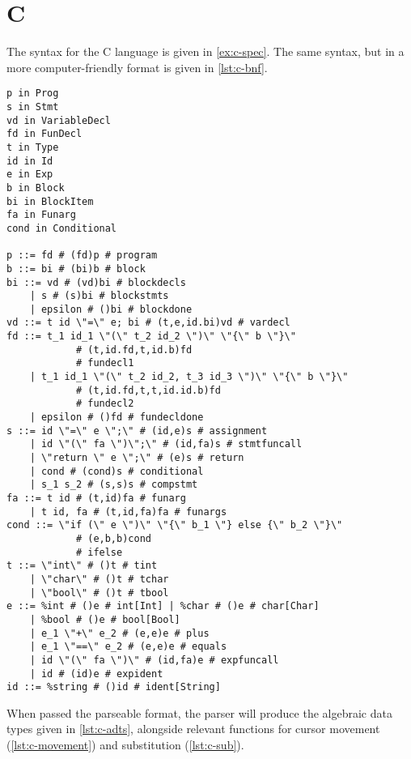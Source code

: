 \section{C}

The syntax for the C language is given in \cref{ex:c-spec}.
The same syntax, but in a more computer-friendly format is given in \cref{lst:c-bnf}.

\begin{lstlisting}[style=inline, caption={Parseable format of C language syntax}, label={lst:c-bnf}]
p in Prog
s in Stmt
vd in VariableDecl
fd in FunDecl
t in Type
id in Id
e in Exp
b in Block
bi in BlockItem
fa in Funarg
cond in Conditional

p ::= fd # (fd)p # program
b ::= bi # (bi)b # block
bi ::= vd # (vd)bi # blockdecls 
    | s # (s)bi # blockstmts 
    | epsilon # ()bi # blockdone
vd ::= t id \"=\" e; bi # (t,e,id.bi)vd # vardecl
fd ::= t_1 id_1 \"(\" t_2 id_2 \")\" \"{\" b \"}\" 
            # (t,id.fd,t,id.b)fd 
            # fundecl1 
    | t_1 id_1 \"(\" t_2 id_2, t_3 id_3 \")\" \"{\" b \"}\" 
            # (t,id.fd,t,t,id.id.b)fd 
            # fundecl2 
    | epsilon # ()fd # fundecldone
s ::= id \"=\" e \";\" # (id,e)s # assignment 
    | id \"(\" fa \")\";\" # (id,fa)s # stmtfuncall 
    | \"return \" e \";\" # (e)s # return 
    | cond # (cond)s # conditional 
    | s_1 s_2 # (s,s)s # compstmt
fa ::= t id # (t,id)fa # funarg 
    | t id, fa # (t,id,fa)fa # funargs
cond ::= \"if (\" e \")\" \"{\" b_1 \"} else {\" b_2 \"}\" 
            # (e,b,b)cond 
            # ifelse
t ::= \"int\" # ()t # tint 
    | \"char\" # ()t # tchar 
    | \"bool\" # ()t # tbool
e ::= %int # ()e # int[Int] | %char # ()e # char[Char] 
    | %bool # ()e # bool[Bool] 
    | e_1 \"+\" e_2 # (e,e)e # plus 
    | e_1 \"==\" e_2 # (e,e)e # equals 
    | id \"(\" fa \")\" # (id,fa)e # expfuncall 
    | id # (id)e # expident
id ::= %string # ()id # ident[String]
\end{lstlisting}

When passed the parseable format, the parser will produce the algebraic data types
given in \cref{lst:c-adts}, alongside relevant functions for cursor movement (\cref{lst:c-movement})
and substitution (\cref{lst:c-sub}).

